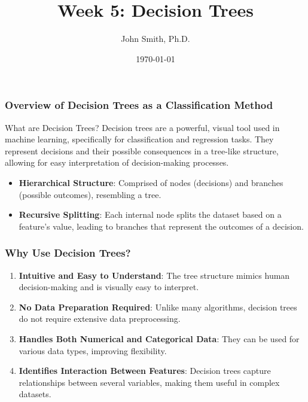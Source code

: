 \documentclass[aspectratio=169]{beamer}
\title[Week 5: Decision Trees]{Week 5: Decision Trees}
\author[J. Smith]{John Smith, Ph.D.}
\institute[University Name]{
  Department of Computer Science\\
  University Name\\
  \vspace{0.3cm}
  Email: email@university.edu\\
  Website: www.university.edu
}
\date{\today}
\begin{document}
\frame{\titlepage}

\begin{frame}[fragile]
    \titlepage
\end{frame}

\begin{frame}[fragile]
    \frametitle{Overview of Decision Trees as a Classification Method}
    
    \begin{block}{What are Decision Trees?}
        Decision trees are a powerful, visual tool used in machine learning, specifically for classification and regression tasks. They represent decisions and their possible consequences in a tree-like structure, allowing for easy interpretation of decision-making processes.
    \end{block}
    
    \begin{itemize}
        \item \textbf{Hierarchical Structure}: Comprised of nodes (decisions) and branches (possible outcomes), resembling a tree.
        \item \textbf{Recursive Splitting}: Each internal node splits the dataset based on a feature's value, leading to branches that represent the outcomes of a decision.
    \end{itemize}
\end{frame}

\begin{frame}[fragile]
    \frametitle{Why Use Decision Trees?}
    
    \begin{enumerate}
        \item \textbf{Intuitive and Easy to Understand}: The tree structure mimics human decision-making and is visually easy to interpret.
        \item \textbf{No Data Preparation Required}: Unlike many algorithms, decision trees do not require extensive data preprocessing.
        \item \textbf{Handles Both Numerical and Categorical Data}: They can be used for various data types, improving flexibility.
        \item \textbf{Identifies Interaction Between Features}: Decision trees capture relationships between several variables, making them useful in complex datasets.
    \end{enumerate}
\end{frame}
\end{document}
